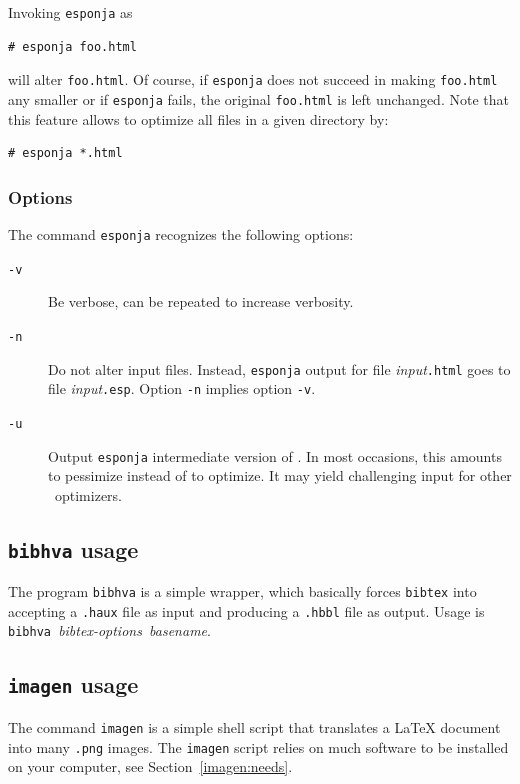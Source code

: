 Invoking \texttt{esponja} as
\begin{verbatim}
# esponja foo.html
\end{verbatim}
will alter \texttt{foo.html}.
Of course, if \texttt{esponja} does not succeed in making \texttt{foo.html} any
smaller or if \texttt{esponja} fails, the original \texttt{foo.html}
is left unchanged.
Note that this feature allows to optimize all \html{} files in a given directory
by:
\begin{verbatim}
# esponja *.html
\end{verbatim}



\subsubsection{Options}\label{esponjaoptions}
The command \texttt{esponja} recognizes the following options:
\begin{description}
\item[{\tt -v}]Be verbose, can be repeated to increase verbosity.
\item[{\tt -n}]Do not alter input files. Instead, \texttt{esponja}
output for file \textit{input}\texttt{.html} goes to file
\textit{input}\texttt{.esp}. Option \texttt{-n} implies option \texttt{-v}.
\item[{\tt -u}]Output \texttt{esponja} intermediate version of \html.
In most occasions, this amounts to pessimize instead of to optimize.
It may yield challenging input for other \html~optimizers.
\end{description}

\subsection{\texttt{bibhva}\label{bibhva} usage}
The program \texttt{bibhva}
is a simple wrapper, which basically
forces \texttt{bibtex} into accepting a \texttt{.haux} file as input
and producing a \texttt{.hbbl} file as output.
Usage is
\texttt{bibhva }\textit{bibtex-options}\texttt{ }\textit{basename}.


\subsection{\texttt{imagen} usage}\label{imagenusage}
The command \texttt{imagen} is a simple shell script that translates
a \LaTeX{} document into many \texttt{.png} images.
The \texttt{imagen} script relies on much software to be installed on
your computer, see Section~\ref{imagen:needs}.


